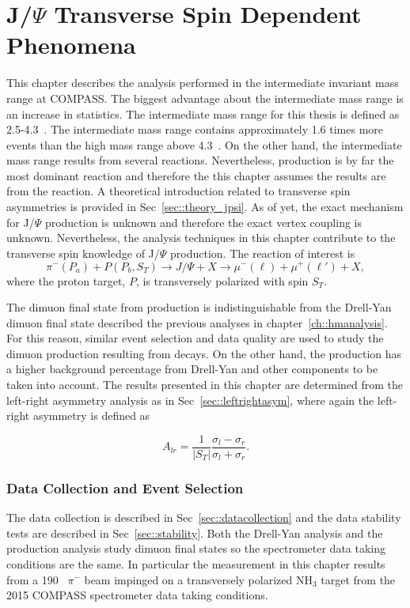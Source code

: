\chapter{J/$\Psi$ Transverse Spin Dependent Phenomena}
\label{ch::jpsi}
\ifpdf
\graphicspath{{Chapters/JPsi/Figs/}}
\fi

This chapter describes the analysis performed in the intermediate invariant mass
range at COMPASS.  The biggest advantage about the intermediate mass range is an
increase in statistics.  The intermediate mass range for this thesis is defined
as 2.5-4.3~{\gvcw}.  The intermediate mass range contains approximately 1.6
times more events than the high mass range above 4.3~{\gvcw}.  On the other
hand, the intermediate mass range results from several reactions.  Nevertheless,
{\jp} production is by far the most dominant reaction and therefore the this
chapter assumes the results are from the {\jp} reaction.  A theoretical
introduction related to transverse {\jp} spin asymmetries is provided in
Sec~\ref{sec::theory_jpsi}.  As of yet, the exact mechanism for J/$\Psi$
production is unknown and therefore the exact {\jp} vertex coupling is unknown.
Nevertheless, the analysis techniques in this chapter contribute to the
transverse spin knowledge of J/$\Psi$ production.  The reaction of
interest is
\begin{equation}
  \pi^-(P_a) + P(P_b, S_T) \rightarrow J/\Psi + X \rightarrow \mu^-(\ell) +
  \mu^+(\ell') + X,
\end{equation}
\noindent
where the proton target, $P$, is transversely polarized with spin $S_T$.

The dimuon final state from {\jp} production is indistinguishable from the
Drell-Yan dimuon final state described the previous analyses in
chapter~\ref{ch::hmanalysis}.  For this reason, similar event selection and data
quality are used to study the dimuon production resulting from {\jp} decays.  On
the other hand, the {\jp} production has a higher background percentage from
Drell-Yan and other components to be taken into account.  The results presented
in this chapter are determined from the left-right asymmetry analysis as in
Sec~\ref{sec::leftrightasym}, where again the left-right asymmetry is defined as

\begin{equation}
  A_{lr} = \frac{1}{|S_T|}
  \frac{\sigma_l - \sigma_r}{\sigma_l +
    \sigma_r}.
\end{equation}

\subsection{Data Collection and Event Selection}
The data collection is described in Sec~\ref{sec::datacollection} and the data
stability tests are described in Sec~\ref{sec::stability}.  Both the Drell-Yan
analysis and the {\jp} production analysis study dimuon final states so the
spectrometer data taking conditions are the same.  In particular the measurement
in this chapter results from a 190~{\gvc} $\pi^-$ beam impinged on a
transversely polarized NH$_3$ target from the 2015 COMPASS spectrometer data
taking conditions.

